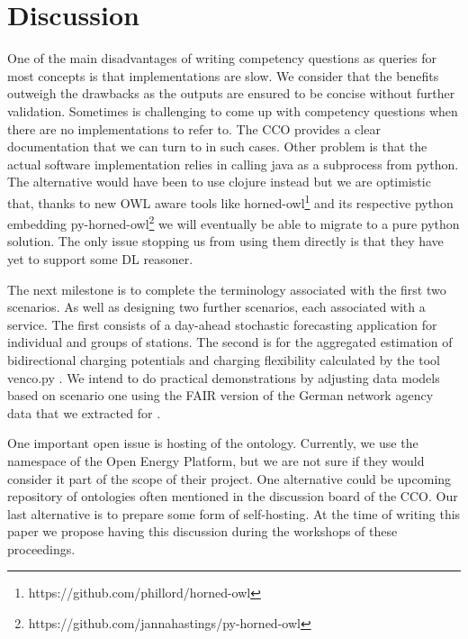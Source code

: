 \section{Discussion}
\label{discussion}

One of the main disadvantages of writing competency questions as queries for
most concepts is that implementations are slow. We consider that the benefits
outweigh the drawbacks as the outputs are ensured to be concise without further
validation. Sometimes is challenging to come up with competency questions when
there are no implementations to refer to. The CCO provides a clear documentation
that we can turn to in such cases. Other problem is that the actual software
implementation relies in calling java as a subprocess from python. The
alternative would have been to use clojure instead but we are optimistic that,
thanks to new OWL aware tools like
horned-owl\footnote{https://github.com/phillord/horned-owl} and its respective
python embedding
py-horned-owl\footnote{https://github.com/jannahastings/py-horned-owl} we will
eventually be able to migrate to a pure python solution. The only issue stopping
us from using them directly is that they have yet to support some DL reasoner.

The next milestone is to complete the terminology associated with the first two
scenarios. As well as designing two further scenarios, each associated with a
service. The first consists of a day-ahead stochastic forecasting application
for individual and groups of stations. The second is for the aggregated
estimation of bidirectional charging potentials and charging flexibility
calculated by the tool {venco.py} \cite{Miorelli.2024}.  
We intend to do practical demonstrations  by adjusting data models based on
scenario one using the FAIR version of the German network agency data that we
extracted for \cite{ArellanoRuiz.2024}.

One important open issue is hosting of the ontology. Currently, we use the
namespace of the Open Energy Platform, but we are not sure if they would
consider it part of the scope of their project. One alternative could be
upcoming repository of ontologies often mentioned in the discussion board of the
CCO. Our last alternative is to prepare some form of self-hosting. At the time
of writing this paper we propose having this discussion during the workshops of
these proceedings.
